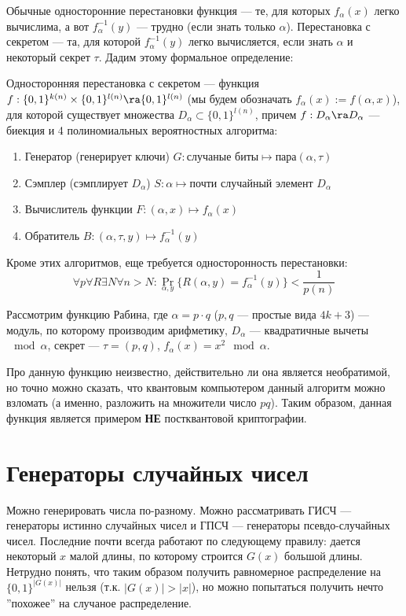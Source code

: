 Обычные односторонние перестановки функция --- те, для которых \(f_\alpha(x)\) легко вычислима, а вот \(f_\alpha^{-1}(y)\) --- трудно (если знать только \(\alpha\)). Перестановка с секретом --- та, для которой \(f_\alpha^{-1}(y)\) легко вычисляется, если знать \(\alpha\) и некоторый секрет \(\tau\). Дадим этому формальное определение:

\begin{definition}
    Односторонняя перестановка с секретом --- функция \(f: \{0, 1\}^{k(n)} \times \{0, 1\}^{l(n)} \ra \{0, 1\}^{l(n)}\) (мы будем обозначать \(f_\alpha(x) := f(\alpha, x)\)), для которой существует множества \(D_\alpha \subset \{0, 1\}^{l(n)}\), причем \(f: D_\alpha \ra D_\alpha\) --- биекция и 4 полиномиальных вероятностных алгоритма:
    \begin{enumerate}
        \item Генератор (генерирует ключи) \(G: \text{случаные биты} \mapsto \text{пара}(\alpha, \tau)\) 
        \item Сэмплер (сэмплирует \(D_\alpha\)) \(S: \alpha \mapsto \text{почти случайный элемент } D_\alpha\)
        \item Вычислитель функции \(F: (\alpha, x) \mapsto f_\alpha(x)\)
        \item Обратитель \(B: (\alpha, \tau, y) \mapsto f_\alpha^{-1}(y)\)
    \end{enumerate}
    Кроме этих алгоритмов, еще требуется односторонность перестановки:
    \[\forall p \forall R \exists N \forall n > N: \Pr_{\alpha, y}\{R(\alpha, y) = f^{-1}_\alpha(y)\} < \frac{1}{p(n)}\]
\end{definition}

\begin{example}
    Рассмотрим функцию Рабина, где \(\alpha = p \cdot q\) (\(p, q\) --- простые вида \(4k + 3\)) --- модуль, по которому производим арифметику, \(D_\alpha\) --- квадратичные вычеты \(\mod \alpha\), секрет --- \(\tau = (p, q)\), \(f_\alpha(x) = x^2 \mod \alpha\).
\end{example}

\begin{note}
    Про данную функцию неизвестно, действительно ли она является необратимой, но точно можно сказать, что квантовым компьютером данный алгоритм можно взломать (а именно, разложить на множители число \(pq\)). Таким образом, данная функция является примером \textbf{НЕ} постквантовой криптографии.
\end{note}

\section{Генераторы случайных чисел}
Можно генерировать числа по-разному. Можно рассматривать ГИСЧ --- генераторы истинно случайных чисел и ГПСЧ --- генераторы псевдо-случайных чисел. Последние почти всегда работают по следующему правилу: дается некоторый \(x\) малой длины, по которому строится \(G(x)\) большой длины. Нетрудно понять, что таким образом получить равномерное распределение на \(\{0, 1\}^{|G(x)|}\) нельзя (т.к. \(|G(x)| > |x|\)), но можно попытаться получить нечто ''похожее'' на случаное распределение.

